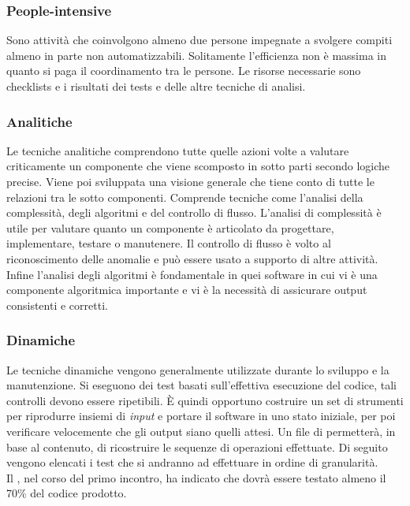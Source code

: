 		\subsubsection{People-intensive}	
	Sono attività che coinvolgono almeno due persone impegnate a svolgere compiti almeno in parte non automatizzabili. Solitamente l'efficienza non è massima in quanto si paga il coordinamento tra le persone. Le risorse necessarie sono checklists e i risultati dei tests e delle altre tecniche di analisi.	
	
		\subsubsection{Analitiche}		
		Le tecniche analitiche comprendono tutte quelle azioni volte a valutare criticamente un 	componente che viene scomposto in sotto parti secondo logiche precise. Viene poi sviluppata una visione generale che tiene conto di tutte le relazioni tra le sotto componenti. Comprende tecniche come l'analisi della complessità, degli algoritmi e del controllo di flusso. L'analisi di complessità è utile per valutare quanto un componente è articolato da progettare, implementare, testare o manutenere. Il controllo di flusso è volto al riconoscimento delle anomalie e può essere usato a supporto di altre attività. Infine l'analisi degli algoritmi è fondamentale in quei software in cui vi è una componente algoritmica importante e vi è la necessità di assicurare output consistenti e corretti. 
				
		\subsubsection{Dinamiche}
		Le tecniche dinamiche vengono generalmente utilizzate durante lo sviluppo e la manutenzione. Si eseguono dei test basati sull'effettiva esecuzione del codice, tali controlli devono essere ripetibili. È quindi opportuno costruire un set di strumenti per riprodurre insiemi di \emph{input} e portare il software in uno stato iniziale, per poi verificare velocemente che gli output siano quelli attesi. Un file di  permetterà, in base al contenuto, di ricostruire le sequenze di operazioni effettuate. Di seguito vengono elencati i test che si andranno ad effettuare in ordine di granularità.\\
		Il , nel corso del primo incontro, ha indicato che dovrà essere testato almeno il  70\% del codice prodotto.
		

